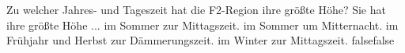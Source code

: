    {Zu welcher Jahres- und Tageszeit hat die F2-Region ihre größte Höhe? Sie hat ihre größte Höhe ...}
    {im Sommer zur Mittagszeit.}
    {im Sommer um Mitternacht.}
    {im Frühjahr und Herbst zur Dämmerungszeit.}
    {im Winter zur Mittagszeit.}
    {false}{false}